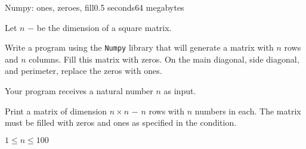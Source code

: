 \begin{problem}{Numpy: ones, zeroes, fill}{}{}{0.5 seconds}{64 megabytes}

Let $n$ $-$ be the dimension of a square matrix.

Write a program using the \texttt{Numpy} library that will generate a matrix with $n$ rows and $n$ columns.
Fill this matrix with zeros. On the main diagonal, side diagonal, and perimeter, replace the zeros with ones.

\InputFile
Your program receives a natural number $n$ as input.

\OutputFile
Print a matrix of dimension $n \times n$ $-$ $n$ rows with $n$ numbers in each. 
The matrix must be filled with zeros and ones as specified in the condition.

\Constraints
$1 \le n \le 100$

\Examples
\begin{example}
%
%
\end{example}

\end{problem}


